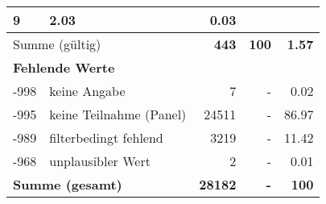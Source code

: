 \begin{longtable}{lXrrr}
       \num{9} &
       \num[round-mode=places,round-precision=2]{2.03} &
         \num[round-mode=places,round-precision=2]{0.03} \\
     \midrule
     \multicolumn{2}{l}{Summe (gültig)} &
       \textbf{\num{443}} &
     \textbf{\num{100}} &
       \textbf{\num[round-mode=places,round-precision=2]{1.57}} \\
     \multicolumn{5}{l}{\textbf{Fehlende Werte}}\\
       -998 &
       keine Angabe &
         \num{7} &
        - &
         \num[round-mode=places,round-precision=2]{0.02} \\
       -995 &
       keine Teilnahme (Panel) &
         \num{24511} &
        - &
         \num[round-mode=places,round-precision=2]{86.97} \\
       -989 &
       filterbedingt fehlend &
         \num{3219} &
        - &
         \num[round-mode=places,round-precision=2]{11.42} \\
       -968 &
       unplausibler Wert &
         \num{2} &
        - &
         \num[round-mode=places,round-precision=2]{0.01} \\
     \midrule
     \multicolumn{2}{l}{\textbf{Summe (gesamt)}} &
          \textbf{\num{28182}} &
        \textbf{-} &
        \textbf{\num{100}} \\
     \bottomrule
     \end{longtable}
     
